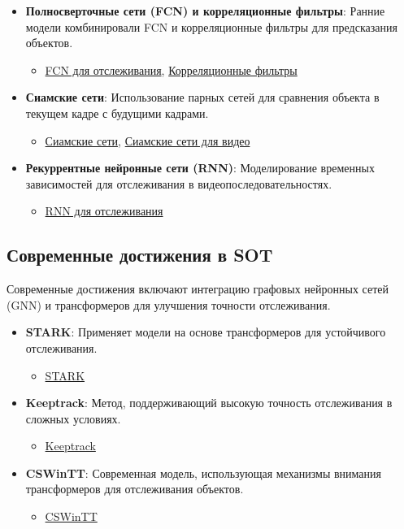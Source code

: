 \begin{itemize}
    \item \textbf{Полносверточные сети (FCN) и корреляционные фильтры}: Ранние модели комбинировали FCN и корреляционные фильтры для предсказания объектов.
    \begin{itemize}
        \item \href{https://arxiv.org/pdf/1506.01497.pdf}{FCN для отслеживания}, \href{https://arxiv.org/pdf/1405.6569.pdf}{Корреляционные фильтры}
    \end{itemize}
    \item \textbf{Сиамские сети}: Использование парных сетей для сравнения объекта в текущем кадре с будущими кадрами.
    \begin{itemize}
        \item \href{https://arxiv.org/pdf/1708.07669.pdf}{Сиамские сети}, \href{https://arxiv.org/pdf/1710.08833.pdf}{Сиамские сети для видео}
    \end{itemize}
    \item \textbf{Рекуррентные нейронные сети (RNN)}: Моделирование временных зависимостей для отслеживания в видеопоследовательностях.
    \begin{itemize}
        \item \href{https://arxiv.org/pdf/1907.12838.pdf}{RNN для отслеживания}
    \end{itemize}
\end{itemize}

\subsection{Современные достижения в SOT}
Современные достижения включают интеграцию графовых нейронных сетей (GNN) и трансформеров для улучшения точности отслеживания.

\begin{itemize}
    \item \textbf{STARK}: Применяет модели на основе трансформеров для устойчивого отслеживания.
    \begin{itemize}
        \item \href{https://arxiv.org/pdf/2103.17154.pdf}{STARK}
    \end{itemize}
    \item \textbf{Keeptrack}: Метод, поддерживающий высокую точность отслеживания в сложных условиях.
    \begin{itemize}
        \item \href{https://arxiv.org/pdf/2010.05781.pdf}{Keeptrack}
    \end{itemize}
    \item \textbf{CSWinTT}: Современная модель, использующая механизмы внимания трансформеров для отслеживания объектов.
    \begin{itemize}
        \item \href{https://arxiv.org/pdf/2112.02759.pdf}{CSWinTT}
    \end{itemize}
\end{itemize}

